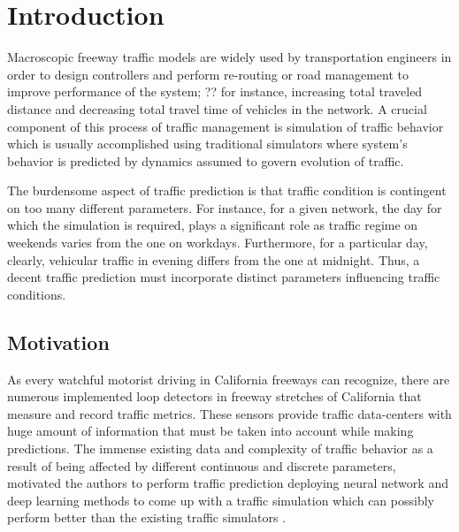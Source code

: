 \documentclass[11pt]{article}
\begin{document}
\section{Introduction}

\par Macroscopic freeway traffic models are widely used by transportation engineers in order to design controllers and perform re-routing or road management to improve performance of the system; {\color{red} ??} for instance, increasing total traveled distance and decreasing total travel time of vehicles in the network. A crucial component of this process of traffic management is simulation of traffic behavior which is usually accomplished using traditional simulators where system's behavior is predicted by  {\color{red}{some hand-engineered }} dynamics assumed to govern evolution of traffic.

The burdensome aspect of traffic prediction is that traffic condition is contingent on too many different parameters. For instance, for a given network, the day for which the simulation is required, plays a significant role as traffic regime on weekends varies from the one on workdays. Furthermore, for a particular day, clearly, vehicular traffic in evening differs from the one at midnight. Thus, a decent traffic prediction must incorporate distinct parameters influencing traffic conditions. {\color{red}{We also need to explain the prediction part of the project + our main contributions}}

\subsection{Motivation}

As every watchful motorist driving in California freeways can recognize, there are numerous implemented loop detectors {\color{red}{Figure}} in freeway stretches of California that measure and record traffic metrics. These sensors provide traffic data-centers with huge amount of information that must be taken into account while making predictions. The immense existing data and complexity of traffic behavior as a result of being affected by different continuous and discrete parameters, motivated the authors to perform traffic prediction deploying neural network and deep learning methods to come up with a traffic simulation which can possibly perform better than the existing traffic simulators\cite{neuralForcast} {\color{red}{we need to separate simulation from prediction}}. 
\end{document}
